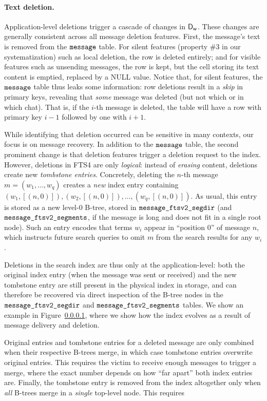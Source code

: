 \paragraph{Text deletion.}
Application-level deletions trigger a cascade of changes in $\textsf{D}_{\textsf{w}}$. These changes are generally consistent across all message deletion features. First, the message's text is removed from the $\texttt{message}$ table. For silent features (property \#3 in our systematization) such as local deletion, the row is deleted entirely; and for visible features such as unsending messages, the row is kept, but the cell storing its text content is emptied, replaced by a NULL value. Notice that, for silent features, the $\texttt{message}$ table thus leaks some information: row deletions result in a \emph{skip} in primary keys, revealing that \emph{some} message was deleted (but not which or in which chat). That is, if the $i$-th message is deleted, the table will have a row with primary key $i-1$ followed by one with $i+1$.

While identifying that deletion occurred can be sensitive in many contexts, our focus is on message recovery. In addition to the $\texttt{message}$ table, the second prominent change is that deletion features trigger a deletion request to the index. However, deletions in FTS4 are only \emph{logical}: instead of \emph{erasing} content, deletions create new \emph{tombstone entries}. Concretely, deleting the $n$-th message $m = (w_1, \dots, w_q)$ creates a \emph{new} index entry containing $(w_1, [(n, 0)]), (w_2, [(n, 0)]), \dots, (w_q, [(n, 0)])$. As usual, this entry is stored as a new level-0 B-tree, stored in $\texttt{message\_ftsv2\_segdir}$ (and $\texttt{message\_ftsv2\_segments}$, if the message is long and does not fit in a single root node). Such an entry encodes that terms $w_i$ appear in ``position 0'' of message $n$, which instructs future search queries to omit $m$ from the search results for any $w_i$.

Deletions in the search index are thus only at the application-level: both the original index entry (when the message was sent or received) and the new tombstone entry are still present in the physical index in storage, and can therefore be recovered via direct inspection of the B-tree nodes in the $\texttt{message\_ftsv2\_segdir}$ and $\texttt{message\_ftsv2\_segments}$ tables.
We show an example in Figure~\ref{}, where we show how the index evolves as a result of message delivery and deletion.

Original entries and tombstone entries for a deleted message are only combined when their respective B-trees merge, in which case tombstone entries overwrite original entries. This requires the victim to receive enough messages to trigger a merge, where the exact number depends on how ``far apart'' both index entries are. Finally, the tombstone entry is removed from the index altogether only when \emph{all} B-trees merge in a \emph{single} top-level node. This requires


